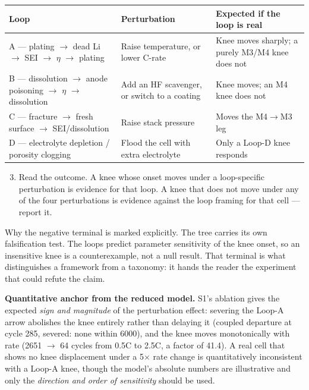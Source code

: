 \documentclass[11pt,a4paper]{article}
\renewcommand{\arraystretch}{1.15}
\begin{document}
\begingroup\small
\setlength{\tabcolsep}{3pt}
\renewcommand{\arraystretch}{1.12}
\sloppy
\begin{tabular}{@{}>{\raggedright\arraybackslash}p{}>{\raggedright\arraybackslash}p{}>{\raggedright\arraybackslash}p{}@{}}
\hline
\textbf{Loop} & \textbf{Perturbation} & \textbf{Expected if the loop is real} \\ \hline
A --- plating \ensuremath{\rightarrow} dead Li \ensuremath{\rightarrow} SEI \ensuremath{\rightarrow} \ensuremath{\eta} \ensuremath{\rightarrow} plating & Raise temperature, or lower C-rate & Knee moves sharply; a purely M3/M4 knee does not \\
\hline
B --- dissolution \ensuremath{\rightarrow} anode poisoning \ensuremath{\rightarrow} \ensuremath{\eta} \ensuremath{\rightarrow} dissolution & Add an HF scavenger, or switch to a coating & Knee moves; an M4 knee does not \\
\hline
C --- fracture \ensuremath{\rightarrow} fresh surface \ensuremath{\rightarrow} SEI/dissolution & Raise stack pressure & Moves the M4\ensuremath{\rightarrow}M3 leg \\
\hline
D --- electrolyte depletion / porosity clogging & Flood the cell with extra electrolyte & Only a Loop-D knee responds \\
\hline
\end{tabular}
\endgroup



\begin{enumerate}
  \setcounter{enumi}{2}
  \item Read the outcome. A knee whose onset moves under a loop-specific perturbation is evidence for that loop. A knee that does not move under any of the four perturbations is evidence against the loop framing for that cell --- report it.
\end{enumerate}


Why the negative terminal is marked explicitly. The tree carries its own falsification test. The loops predict parameter sensitivity of the knee onset, so an insensitive knee is a counterexample, not a null result. That terminal is what distinguishes a framework from a taxonomy: it hands the reader the experiment that could refute the claim.


\textbf{Quantitative anchor from the reduced model.} S1's ablation gives the expected \emph{sign and magnitude} of the perturbation effect: severing the Loop-A arrow abolishes the knee entirely rather than delaying it (coupled departure at cycle 285, severed: none within 6000), and the knee moves monotonically with rate (2651 \ensuremath{\rightarrow} 64 cycles from 0.5C to 2.5C, a factor of 41.4). A real cell that shows no knee displacement under a 5\ensuremath{\times} rate change is quantitatively inconsistent with a Loop-A knee, though the model's absolute numbers are illustrative and only the \emph{direction and order of sensitivity} should be used.
\end{document}
